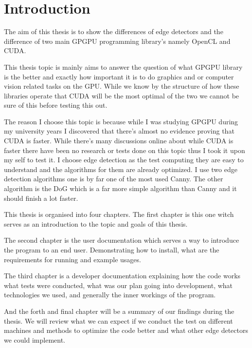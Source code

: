 \chapter{Introduction}
\label{chap:intro}

The aim of this thesis is to show the differences of edge detectors and the difference of two main \ac{GPGPU} programming library's namely OpenCL and CUDA.

This thesis 	topic is mainly aims to answer the question of what \ac{GPGPU} library is the better and exactly how important it is to do graphics and or computer vision related tasks on the \ac{GPU}. While we know by the structure of how these libraries operate that CUDA will be the most optimal of the two we cannot be sure of this before testing this out.

The reason I choose this topic is because while I was studying \ac{GPGPU} during my university years I discovered that there's almost no evidence proving that CUDA is faster. While there's many discussions online about while CUDA is faster there have been no research or tests done on this topic thus I took it upon my self to test it. I choose edge detection as the test computing they are easy to understand and the algorithms for them are already optimized. I use two edge detection algorithms one is by far one of the most used \ac{Canny}. The other algorithm is the \ac{DoG} which is a far more simple algorithm than \ac{Canny} and it should finish a lot faster.

This thesis is organised into four chapters. The first chapter is this one witch serves as an introduction to the topic and goals of this thesis.

The second chapter is the user documentation which serves a way to introduce the program to an end user. Demonstrating how to install, what are the requirements for running and example usages.

The third chapter is a developer documentation explaining how the code works what tests were conducted, what was our plan going into development, what technologies we used, and generally the inner workings of the program.

And the forth and final chapter will be a summary of our findings during the thesis. We will review what we can expect if we conduct the test on different machines and methods to optimize the code better and what other edge detectors we could implement.